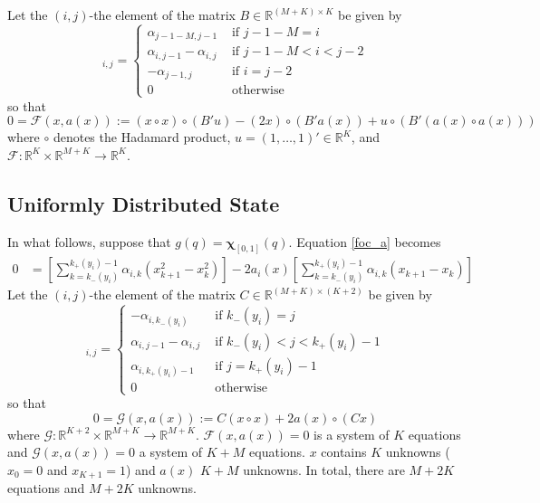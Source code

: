 \documentclass[12pt]{article}
\begin{document}
Let the $(i,j)$-the element of the matrix $B\in\mathbb{R}^{(M+K)\times K}$ be given by
\begin{equation}
	[B]_{i,j}=
	\begin{cases}
		\alpha_{j-1-M,j-1} & \text{ if } j-1-M=i \\
		\alpha_{i,j-1}-\alpha_{i,j} & \text{ if } j-1-M<i<j-2 \\
		-\alpha_{j-1,j} & \text{ if } i=j-2 \\
		0 & \text{ otherwise }
	\end{cases}
\end{equation}
so that
\begin{equation}
	0=\mathcal{F}(x,a(x)):=(x\circ x)\circ(B'u)-(2x)\circ(B'a(x))+u\circ(B'(a(x)\circ a(x)))
\end{equation}
where $\circ$ denotes the Hadamard product, $u=(1,\ldots,1)'\in\mathbb{R}^{K}$, and $\mathcal{F}:\mathbb{R}^{K}\times\mathbb{R}^{M+K}\rightarrow\mathbb{R}^{K}$.
\subsection{Uniformly Distributed State}
In what follows, suppose that $g(q)=\mathbf{\chi}_{[0,1]}(q)$. Equation \ref{foc_a} becomes
\begin{align}
	0&=\left[\sum_{k=k_{-}(y_{i})}^{k_{+}(y_{i})-1}{\alpha_{i,k}\left(x_{k+1}^{2}-x_{k}^{2}\right)}\right]-2a_{i}(x)\left[\sum_{k=k_{-}(y_{i})}^{k_{+}(y_{i})-1}{\alpha_{i,k}(x_{k+1}-x_{k})}\right]
\end{align}
Let the $(i,j)$-the element of the matrix $C\in\mathbb{R}^{(M+K)\times(K+2)}$ be given by
\begin{equation}
	[C]_{i,j}=
	\begin{cases}
		-\alpha_{i,k_{-}(y_{i})} & \text{ if } k_{-}(y_{i})=j \\
		\alpha_{i,j-1}-\alpha_{i,j} & \text{ if } k_{-}(y_{i})<j<k_{+}(y_{i})-1\\
		\alpha_{i,k_{+}(y_{i})-1} & \text{ if } j=k_{+}(y_{i})-1\\
		0 & \text{ otherwise }
	\end{cases}
\end{equation}
so that
\begin{equation}
	0=\mathcal{G}(x,a(x)):=C(x\circ x)+2a(x)\circ (Cx)
\end{equation}
where $\mathcal{G}:\mathbb{R}^{K+2}\times\mathbb{R}^{M+K}\rightarrow\mathbb{R}^{M+K}$. $\mathcal{F}(x,a(x))=0$ is a system of $K$ equations and $\mathcal{G}(x,a(x))=0$ a system of $K+M$ equations. $x$ contains $K$ unknowns ($x_{0}=0$ and $x_{K+1}=1$) and $a(x)$ $K+M$ unknowns. In total, there are $M+2K$ equations and $M+2K$ unknowns. 
\end{document}

